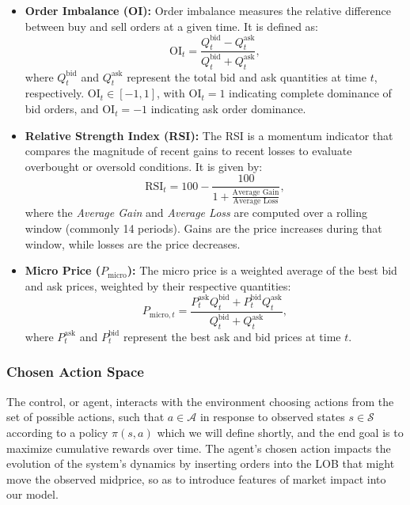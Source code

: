 \begin{itemize}
    \item \textbf{Order Imbalance (OI):} Order imbalance measures the relative difference between buy and sell orders at a given time. It is defined as:
    \[
        \text{OI}_t = \frac{Q_t^{\text{bid}} - Q_t^{\text{ask}}}{Q_t^{\text{bid}} + Q_t^{\text{ask}}},
    \]
    where \( Q_t^{\text{bid}} \) and \( Q_t^{\text{ask}} \) represent the total bid and ask quantities at time \( t \), respectively. \( \text{OI}_t \in [-1, 1] \), with \( \text{OI}_t = 1 \) indicating complete dominance of bid orders, and \( \text{OI}_t = -1 \) indicating ask order dominance.

    \item \textbf{Relative Strength Index (RSI):} The RSI is a momentum indicator that compares the magnitude of recent gains to recent losses to evaluate overbought or oversold conditions. It is given by:
    \[
        \text{RSI}_t = 100 - \frac{100}{1 + \frac{\text{Average Gain}}{\text{Average Loss}}},
    \]
    where the \textit{Average Gain} and \textit{Average Loss} are computed over a rolling window (commonly 14 periods). Gains are the price increases during that window, while losses are the price decreases.

    \item \textbf{Micro Price (\( P_{\text{micro}} \)):} The micro price is a weighted average of the best bid and ask prices, weighted by their respective quantities:
    \[
        P_{\text{micro},t} = \frac{P_t^{\text{ask}} Q_t^{\text{bid}} + P_t^{\text{bid}} Q_t^{\text{ask}}}{Q_t^{\text{bid}} + Q_t^{\text{ask}}},
    \]
    where \( P_t^{\text{ask}} \) and \( P_t^{\text{bid}} \) represent the best ask and bid prices at time \( t \).

\end{itemize}

\subsubsection{Chosen Action Space}

The control, or agent, interacts with the environment choosing actions from the set of possible actions, such that $a \in \mathcal{A}$ in response to observed states $s \in \mathcal{S}$ according to a policy $\pi (s, a)$ which we will define shortly, and the end goal is to maximize cumulative rewards over time. The agent's chosen action impacts the evolution of the system's dynamics by inserting orders into the LOB that might move the observed midprice, so as to introduce features of market impact into our model.

